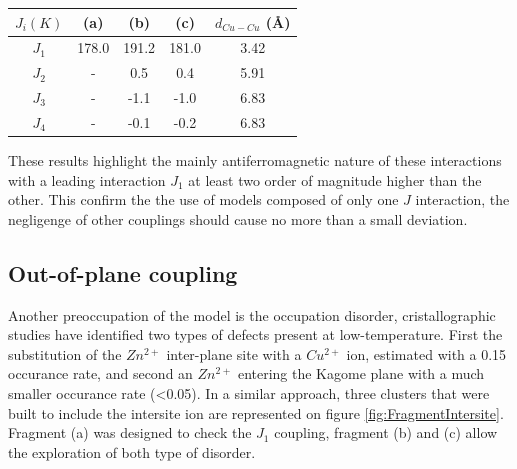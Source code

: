 \documentclass[10pt]{report}
\numberwithin{equation}{section}
\begin{document}
\begin{center}\label{ResultatsDFT}
    \begin{tabular}{c c c c c}
        \hline
        $J_i (K)$ & (a) & (b) & (c) & $d_{Cu-Cu}$ (\AA{}) \\
        \hline
        $J_1$ & 178.0 & 191.2 & 181.0 &3.42\\
        $J_2$ & - & 0.5  & 0.4& 5.91\\
        $J_3$ & -& -1.1& -1.0&6.83\\
        $J_4$ & -& -0.1 & -0.2& 6.83\\
        \hline
    \end{tabular}
\end{center}

These results highlight the mainly antiferromagnetic nature of these interactions with a leading interaction $J_1$ at least two order of magnitude higher than the other.
This confirm the the use of models composed of only one $J$ interaction, the negligenge of other couplings should cause no more than a small deviation.

\subsection*{Out-of-plane coupling}

Another preoccupation of the model is the occupation disorder, cristallographic studies have identified two types of defects present at low-temperature. 
First the substitution of the $Zn^{2+}$ inter-plane site with a $Cu^{2+}$ ion, estimated with a 0.15 occurance rate, and second an $Zn^{2+}$ entering the Kagome plane with a much smaller occurance rate (<0.05).
In a similar approach, three clusters that were built to include the intersite ion are represented on figure \ref{fig:FragmentIntersite}.
Fragment (a) was designed to check the $J_1$ coupling, fragment (b) and (c) allow the exploration of both type of disorder.

\end{document}
